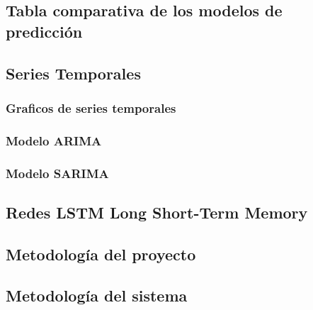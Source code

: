 \documentclass[letterpaper, 12pt]{report}
\begin{document}
\subsection{Tabla comparativa de los modelos de predicción}


\subsection{Series Temporales}

\subsubsection{Graficos de series temporales}

\subsubsection{Modelo ARIMA}

\subsubsection{Modelo SARIMA}


\subsection{Redes LSTM Long Short-Term Memory}


\subsection{Metodología del proyecto}


\subsection{Metodología del sistema}

\end{document}
